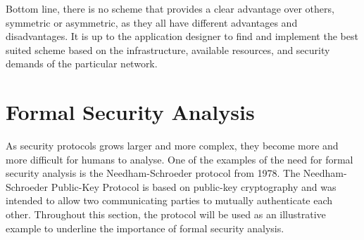 Bottom line, there is no scheme that provides a clear advantage over others, symmetric or asymmetric, as they all have different advantages and disadvantages. It is up to the application designer to find and implement the best suited scheme based on the infrastructure, available resources, and security demands of the particular network. 









\section{Formal Security Analysis} 
\label{sec:formal}

As security protocols grows larger and more complex, they become more and more difficult for humans to analyse. One of the examples of the need for formal security analysis is the Needham-Schroeder protocol \cite{Needham:1978} from 1978. The Needham-Schroeder Public-Key Protocol is based on public-key cryptography and was intended to allow two communicating parties to mutually authenticate each other. Throughout this section, the protocol will be used as an illustrative example to underline the importance of formal security analysis.

